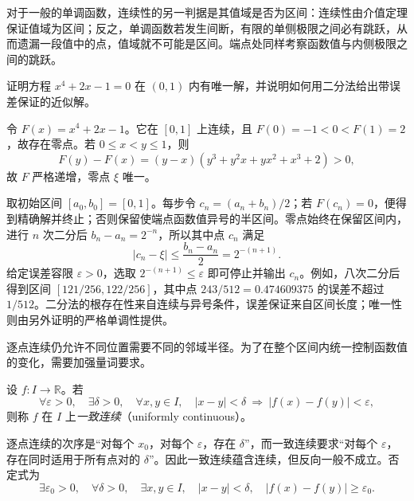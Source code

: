 对于一般的单调函数，连续性的另一判据是其值域是否为区间：连续性由介值定理保证值域为区间；反之，单调函数若发生间断，有限的单侧极限之间必有跳跃，从而遗漏一段值中的点，值域就不可能是区间。端点处同样考察函数值与内侧极限之间的跳跃。

\begin{example}
\label{ex:continuous-zero-and-bisection}
证明方程 $x^4+2x-1=0$ 在 $(0,1)$ 内有唯一解，并说明如何用二分法给出带误差保证的近似解。
\end{example}

\begin{solve}
令 $F(x)=x^4+2x-1$。它在 $[0,1]$ 上连续，且 $F(0)=-1<0<F(1)=2$，故存在零点。若 $0\leq x<y\leq1$，则
\[
    F(y)-F(x)=(y-x)(y^3+y^2x+yx^2+x^3+2)>0,
\]
故 $F$ 严格递增，零点 $\xi$ 唯一。

取初始区间 $[a_0,b_0]=[0,1]$。每步令 $c_n=(a_n+b_n)/2$；若 $F(c_n)=0$，便得到精确解并终止；否则保留使端点函数值异号的半区间。零点始终在保留区间内，进行 $n$ 次二分后 $b_n-a_n=2^{-n}$，所以其中点 $c_n$ 满足
\[
    |c_n-\xi|\leq\frac{b_n-a_n}{2}=2^{-(n+1)}.
\]
给定误差容限 $\varepsilon>0$，选取 $2^{-(n+1)}\leq\varepsilon$ 即可停止并输出 $c_n$。例如，八次二分后得到区间 $[121/256,122/256]$，其中点 $243/512=0.474609375$ 的误差不超过 $1/512$。二分法的根存在性来自连续与异号条件，误差保证来自区间长度；唯一性则由另外证明的严格单调性提供。
\end{solve}

逐点连续仍允许不同位置需要不同的邻域半径。为了在整个区间内统一控制函数值的变化，需要加强量词要求。

\begin{definition}
\label{def:uniform-continuity}
设 $f:I\to\mathbb{R}$。若
\begin{equation}
    \forall\varepsilon>0,\quad\exists\delta>0,\quad
    \forall x,y\in I,\quad
    |x-y|<\delta\ \Longrightarrow\ |f(x)-f(y)|<\varepsilon,
    \label{eq:uniform-continuity}
\end{equation}
则称 $f$ 在 $I$ 上\emph{一致连续}（uniformly continuous）。
\end{definition}

逐点连续的次序是“对每个 $x_0$，对每个 $\varepsilon$，存在 $\delta$”，而一致连续要求“对每个 $\varepsilon$，存在同时适用于所有点对的 $\delta$”。因此一致连续蕴含连续，但反向一般不成立。否定式为
\begin{equation}
    \exists\varepsilon_0>0,\quad\forall\delta>0,\quad
    \exists x,y\in I,\quad |x-y|<\delta,
    \quad |f(x)-f(y)|\geq\varepsilon_0.
    \label{eq:negation-of-uniform-continuity}
\end{equation}

